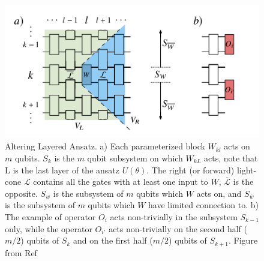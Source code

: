 \begin{figure}
    \centering
    \includegraphics[scale=0.5]{LiteratureReview/Appendices/alterlayeransatz.png}
    \caption{
        Altering Layered Ansatz. 
        a) Each parameterized block $W_{kl}$ acts on $m$ qubits.
        $S_k$ is the $m$ qubit subsystem on which $W_{kL}$ acts, note that L is the last layer of the ansatz $U(\theta)$.
        The right (or forward) light-cone $\mathcal{L}$ contains all the gates with at least one input to $W$, $\overline{\mathcal{L}}$ is the opposite.
        $S_w$ is the subsystem of $m$ qubits which $W$ acts on, and $S_{\overline{w}}$ is the subsystem of $m$ qubits which $W$ have limited connection to.
        b) The example of operator $O_i$ acts non-trivially in the subsystem $S_{k-1}$ only, while the operator $O_{i'}$ acts non-trivially on the second half ($m/2$) qubits of $S_k$ and on the first half ($m/2$) qubits of $S_{k+1}$.
        Figure from Ref \cite{cerezoCostFunctionDependent2021}
    }
    \label{Altering Layered Ansatz}
\end{figure}

